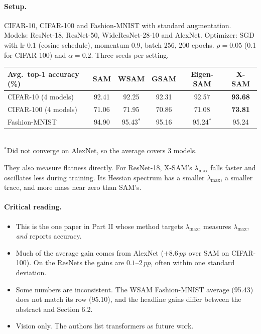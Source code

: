 \documentclass[11pt]{article}
\newcommand{\lmax}{\lambda_{\max}}
\newcommand{\pp}{\,pp}                   %
\theoremstyle{plain}
\begin{document}
\paragraph{Setup.} CIFAR-10, CIFAR-100 and Fashion-MNIST with standard augmentation. Models: ResNet-18, ResNet-50, WideResNet-28-10 and AlexNet.
Optimizer: SGD with lr 0.1 (cosine schedule), momentum 0.9, batch 256, 200 epochs. $\rho = 0.05$ (0.1 for CIFAR-100) and $\alpha = 0.2$. Three seeds per setting.

\begin{center}\small
\begin{tabular}{@{}lccccc@{}}
\toprule
\textbf{Avg.\ top-1 accuracy (\%)} & \textbf{SAM} & \textbf{WSAM} & \textbf{GSAM} & \textbf{Eigen-SAM} & \textbf{X-SAM} \\
\midrule
CIFAR-10 (4 models)  & 92.41 & 92.25 & 92.31 & 92.57 & \textbf{93.68} \\
CIFAR-100 (4 models) & 71.06 & 71.95 & 70.86 & 71.08 & \textbf{73.81} \\
Fashion-MNIST        & 94.90 & 95.43$^\ast$ & 95.16 & 95.24$^\ast$ & 95.24 \\
\bottomrule
\end{tabular}\\[2pt]
{\footnotesize $^\ast$Did not converge on AlexNet, so the average covers 3 models.}
\end{center}

They also measure flatness directly. For ResNet-18, X-SAM's $\lmax$ falls faster and oscillates less during training. Its Hessian spectrum has a smaller $\lmax$, a smaller trace, and more mass near zero than SAM's.

\paragraph{Critical reading.}
\begin{itemize}
  \item This is the one paper in Part II whose method targets $\lmax$, measures $\lmax$, \emph{and} reports accuracy.
  \item Much of the average gain comes from AlexNet ($+8.6\pp$ over SAM on CIFAR-100). On the ResNets the gains are $0.1$--$2\pp$, often within one standard deviation.
  \item Some numbers are inconsistent. The WSAM Fashion-MNIST average (95.43) does not match its row (95.10), and the headline gains differ between the abstract and Section 6.2.
  \item Vision only. The authors list transformers as future work.
\end{itemize}
\end{document}
